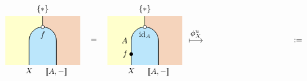 \[
    \begin{tikzpicture}[x=0.6cm,y=0.6cm, line width=0.7pt, hollow/.style={
            circle,
            fill=white,
            draw,
            outer sep=0pt,
            inner sep=1.5pt,
            line width=0.7pt
          }]
    \definecolor{leftcolor}{RGB}{255,255,204}
    \definecolor{midcolor}{HTML}{BBE6FB}
    \definecolor{rightcolor}{HTML}{F5D4BC}

    \node at (-3.75, 1.8) {$=$};
    \draw [|-To, line width=0.5pt] (3.25,1.8) -- (4.25,1.8) node[midway,above] {$\phi^u_X$};
    \node at (11.25, 1.8) {$:=$};

    \begin{scope}[shift={(-7.5,0)}]
        \begin{scope} 
            \clip (-2.75,0) rectangle (2.75, 3.6);     
            \fill[fill=leftcolor] (-3,0) rectangle (0, 4);  
            \fill[fill=rightcolor] (0,0) rectangle (3, 4);  
            \draw[fill=midcolor, rounded corners=0.6cm, line width=0.7pt] (-1, -2) rectangle (1, 2.8);
        \end{scope}
        \draw (0, 3.6) -- (0,2.8);
        \node[below] at (-1, 0) {$X$};
        \node[below] at (1, 0) {$\llbracket A , -\rrbracket$};
        \node[hollow] at (0, 2.8) {};
        \node[below=2pt] at (0, 2.8) {$f$}; 
        \node[above] at (0, 3.6) {$\{*\}$};
    \end{scope}

    \begin{scope}[shift={(0,0)}]
        \begin{scope} 
            \clip (-2.75,0) rectangle (2.75, 3.6);     
            \fill[fill=leftcolor] (-3,0) rectangle (0, 4);  
            \fill[fill=rightcolor] (0,0) rectangle (3, 4);  
            \draw[fill=midcolor, rounded corners=0.6cm, line width=0.7pt] (-1, -2) rectangle (1, 2.8);
        \end{scope}
        \draw (0, 3.6) -- (0,2.8);
        \filldraw [black] (-1,0.8) circle (2pt) node[left=1pt] {$f$};
        \node[below] at (-1, 0) {$X$};
        \node[left=1pt] at (-1, 1.8) {$A$};
        \node[below] at (1, 0) {$\llbracket A , -\rrbracket$};
        \node[hollow] at (0, 2.8) {};
        \node[below=2pt] at (0, 2.8) {$\mathrm{id}_A$}; 
        \node[above] at (0, 3.6) {$\{*\}$};
    \end{scope}


\end{tikzpicture}\]
